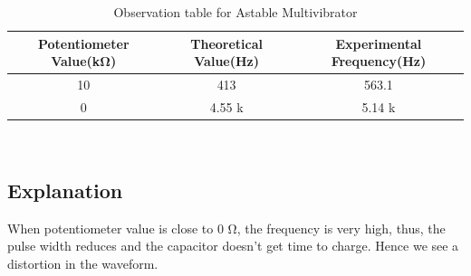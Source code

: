 \documentclass[12pt]{article}
\begin{document}
\newpage
%
%
\begin{table}[h]
\centering  %
\begin{tabular}{|c | c| c|} %
\hline  %
Potentiometer Value(k\si{\ohm}) & Theoretical Value(Hz) & Experimental Frequency(Hz) \\  %
\hline  %
10    & 413 & 563.1 \\  %
0    & 4.55 k & 5.14 k \\  %
\hline	%
\end{tabular}
\caption{Observation table for Astable Multivibrator}
\end{table}
\\
\subsection{Explanation}
When potentiometer value is close to 0 \si{\ohm}, the frequency is very high, thus, the pulse width
reduces and the capacitor doesn't get time to charge. Hence we see a distortion in the
waveform.
\end{document}
